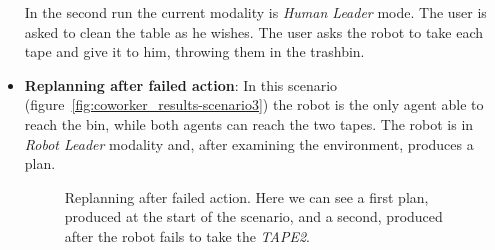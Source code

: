 \begin{itemize}
In the second run the current modality is \textit{Human Leader} mode. The user is
asked to clean the table as he wishes. The user asks the robot to take
each tape and give it to him, throwing them in the trashbin.

\item
\textbf{Replanning after failed action}: 
In this scenario (figure~\ref{fig:coworker_results-scenario3}) the robot is the only agent able to reach the
bin, while both agents can reach the two tapes. The
robot is in \textit{Robot Leader} modality and, after examining the
environment, produces a plan.

\begin{figure}
  \caption[Robot coworker experiment 3]{Replanning after failed action. Here we can see a first
    plan, produced at the start of the scenario, and a second,
    produced after the robot fails to take the \textit{TAPE2}. }
  \centering
\end{figure}
\end{itemize}
